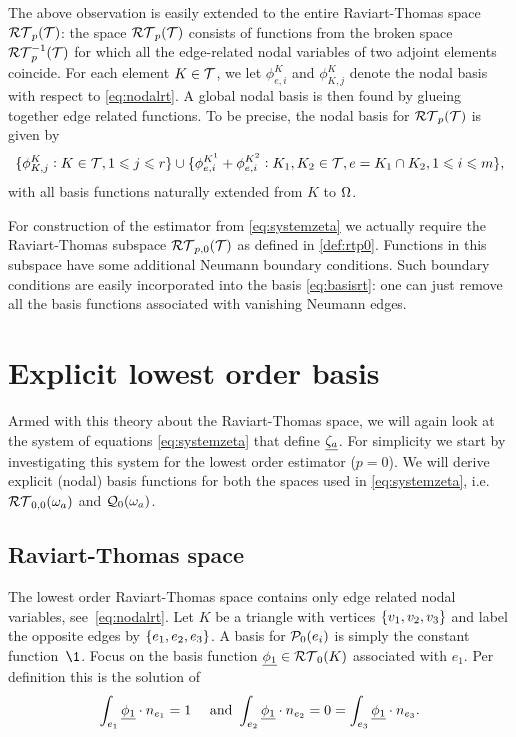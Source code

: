 \documentclass[thesis.tex]{subfiles}
\begin{document}
The above observation is easily extended to the entire Raviart-Thomas space $\RT_p( \T)$:
the space $\RT_p(\T)$ consists of functions from the broken space $\RT_p^{-1}( \T)$ for which all the edge-related
nodal variables of two adjoint elements coincide. For each element $K \in  \T$, we let $\phi^K_{e,i}$ and $\phi^K_{K,j}$
denote the nodal basis with respect to \eqref{eq:nodalrt}. A global nodal basis is then found by
glueing together edge related functions. To be precise, the nodal basis for $\RT_p( \T)$ is given by
\begin{equation}
  \label{eq:basisrt}
  \{\phi^K_{K, j} : K \in  \T, 1 \leq j \leq r\} \cup \{\phi^{K^1}_{e,i} + \phi^{K^2}_{e,i}: K_1, K_2 \in  \T, e = K_1 \cap K_2, 1 \leq i \leq m\},
\end{equation}
with all basis functions naturally extended from $K$ to $\O$.

For construction of the estimator from \eqref{eq:systemzeta} we actually require the Raviart-Thomas subspace 
$\RT_{p,0}(\T)$ as defined in \eqref{def:rtp0}.
Functions in this subspace have some additional Neumann boundary conditions.
Such boundary conditions are easily incorporated into the basis \eqref{eq:basisrt}:
one can just remove all the basis functions associated with vanishing Neumann edges.

\section{Explicit lowest order basis}
Armed with this theory about the Raviart-Thomas space, we will again look at the
system of equations \eqref{eq:systemzeta} that define $\vzeta$. For simplicity we start by
investigating this system for the lowest order estimator ($p=0$).  We will derive
explicit (nodal) basis functions for both the spaces used in \eqref{eq:systemzeta}, i.e.~$\RT_{0,0}(\w_a)$ and $\QQ_0(\w_a)$.

\subsection{Raviart-Thomas space}
The lowest order Raviart-Thomas space contains only edge related nodal variables, see~\eqref{eq:nodalrt}.
Let $K$ be a triangle with vertices $\set{v_1, v_2, v_3}$ and label the opposite edges by $\set{e_1, e_2, e_3}$.
A basis for $\P_0(e_i)$ is simply the constant function~$\1$.
Focus on the basis function $\v{\phi_1} \in \RT_0(K)$ associated with $e_1$.
Per definition this is the solution of
\begin{equation}
  \label{eq:solphi1}
  \int_{e_1} \v{\phi_1}\cdot n_{e_1} = 1 \quad \text{ and } \int_{e_2} \v{\phi_1} \cdot n_{e_2} = 0 = \int_{e_3} \v{\phi_1} \cdot n_{e_3}.
\end{equation}
\end{document}
